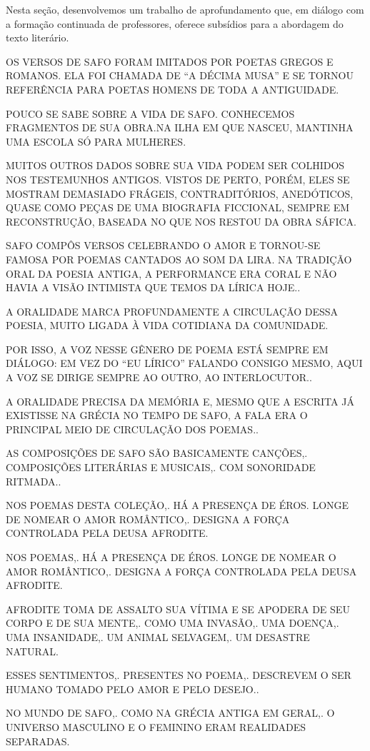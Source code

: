 \documentclass[12pt]{extarticle}
\begin{document}
Nesta seção, desenvolvemos um trabalho de aprofundamento que, em diálogo
com a formação continuada de professores, oferece subsídios para a
abordagem do texto literário.

OS VERSOS DE SAFO FORAM IMITADOS POR POETAS GREGOS E ROMANOS. ELA FOI
CHAMADA DE ``A DÉCIMA MUSA'' E SE TORNOU REFERÊNCIA PARA POETAS HOMENS
DE TODA A ANTIGUIDADE.

POUCO SE SABE SOBRE A VIDA DE SAFO. CONHECEMOS FRAGMENTOS DE SUA OBRA.NA ILHA EM QUE NASCEU, MANTINHA UMA ESCOLA SÓ PARA MULHERES.

MUITOS OUTROS DADOS SOBRE SUA VIDA PODEM SER COLHIDOS NOS TESTEMUNHOS
ANTIGOS. VISTOS DE PERTO, PORÉM, ELES SE MOSTRAM DEMASIADO FRÁGEIS,
CONTRADITÓRIOS, ANEDÓTICOS, QUASE COMO PEÇAS DE UMA BIOGRAFIA FICCIONAL,
SEMPRE EM RECONSTRUÇÃO, BASEADA NO QUE NOS RESTOU DA OBRA SÁFICA.

SAFO COMPÔS VERSOS CELEBRANDO O AMOR E TORNOU-SE FAMOSA POR POEMAS
CANTADOS AO SOM DA LIRA. NA TRADIÇÃO ORAL DA POESIA ANTIGA, A
PERFORMANCE ERA CORAL E NÃO HAVIA A VISÃO INTIMISTA QUE TEMOS DA LÍRICA
HOJE..

A ORALIDADE MARCA PROFUNDAMENTE A CIRCULAÇÃO DESSA POESIA, MUITO LIGADA
À VIDA COTIDIANA DA COMUNIDADE.

POR ISSO, A VOZ NESSE GÊNERO DE POEMA ESTÁ SEMPRE EM DIÁLOGO: EM VEZ DO
``EU LÍRICO'' FALANDO CONSIGO MESMO, AQUI A VOZ SE DIRIGE SEMPRE AO
OUTRO, AO INTERLOCUTOR..

A ORALIDADE PRECISA DA MEMÓRIA E, MESMO QUE A ESCRITA JÁ EXISTISSE NA
GRÉCIA NO TEMPO DE SAFO, A FALA ERA O PRINCIPAL MEIO DE CIRCULAÇÃO DOS
POEMAS..

AS COMPOSIÇÕES DE SAFO SÃO BASICAMENTE CANÇÕES,. COMPOSIÇÕES LITERÁRIAS
E MUSICAIS,. COM SONORIDADE RITMADA..

NOS POEMAS DESTA COLEÇÃO,. HÁ A PRESENÇA DE ÉROS. LONGE DE NOMEAR O AMOR
ROMÂNTICO,. DESIGNA A FORÇA CONTROLADA PELA DEUSA AFRODITE.

NOS POEMAS,. HÁ A PRESENÇA DE ÉROS. LONGE DE NOMEAR O AMOR ROMÂNTICO,.
DESIGNA A FORÇA CONTROLADA PELA DEUSA AFRODITE.


AFRODITE TOMA DE ASSALTO SUA VÍTIMA E SE APODERA DE SEU CORPO E DE SUA
MENTE,. COMO UMA INVASÃO,. UMA DOENÇA,. UMA INSANIDADE,. UM ANIMAL
SELVAGEM,. UM DESASTRE NATURAL.


ESSES SENTIMENTOS,. PRESENTES NO POEMA,. DESCREVEM O SER HUMANO TOMADO
PELO AMOR E PELO DESEJO..


NO MUNDO DE SAFO,. COMO NA GRÉCIA ANTIGA EM GERAL,. O UNIVERSO MASCULINO
E O FEMININO ERAM REALIDADES SEPARADAS.
\end{document}
